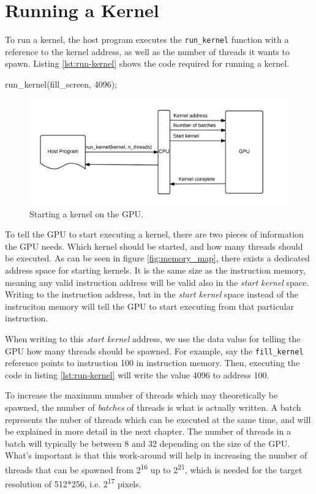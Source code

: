 \section{Running a Kernel}
To run a kernel, the host program executes the \verb/run_kernel/ function with a reference to the kernel address, as well as the number of threads it wants to spawn.
Listing \ref{lst:run-kernel} shows the code required for running a kernel.

\begin{c-code}[caption=Running a kernel, label=lst:run-kernel]
run_kernel(fill_screen, 4096);
\end{c-code}

\begin{figure}[H]
    \centering
    \includegraphics[width=\textwidth]{../cpu/diagrams/running_a_kernel.png}
    \caption{Starting a kernel on the GPU.}
    \label{fig:running_a_kernel}
\end{figure}

To tell the GPU to start executing a kernel,
there are two pieces of information the GPU needs.
Which kernel should be started, and how many threads should be executed.
As can be seen in figure \ref{fig:memory_map}, there exists a dedicated address space for starting kernels.
It is the same size as the instruction memory,
meaning any valid instruction address will be valid also in the \emph{start kernel} space.
Writing to the instruction address,
but in the \emph{start kernel} space instead of the instruciton memory will tell the GPU to start executing from that particular instruction.

When writing to this \emph{start kernel} address, we use the data value for telling the GPU how many threads should be spawned.
For example, say the \verb/fill_kernel/ reference points to instruction 100 in instruction memory.
Then, executing the code in listing \ref{lst:run-kernel} will write the value 4096 to address 100.

To increase the maximum number of threads which may theoretically be spawned,
the number of \emph{batches} of threads is what is actually written.
A batch represents the nuber of threads which can be executed at the same time,
and will be explained in more detail in the next chapter. 
The number of threads in a batch will typically be between 8 and 32 depending on the size of the GPU.
What's important is that this work-around will help in increasing the number of threads that can be spawned from 2\textsuperscript{16} up to 2\textsuperscript{21},
which is needed for the target resolution of 512*256, i.e. 2\textsuperscript{17} pixels.

